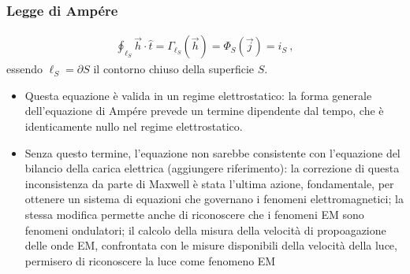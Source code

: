 \documentclass[letterpaper,10pt,italian]{jupyterBook}
\begin{document}
\subsubsection{Legge di Ampére}
\label{\detokenize{ch/electromagnetism/electromagnetism-steady:id1}}\begin{equation*}
\begin{split}\oint_{\ell_S} \vec{h} \cdot \hat{t} = \Gamma_{\ell_S}(\vec{h}) = \Phi_{S}(\vec{j}) = i_S \ ,\end{split}
\end{equation*}
\sphinxAtStartPar
essendo \(\ell_S = \partial S\) il contorno \sphinxhyphen{} chiuso \sphinxhyphen{} della superficie \(S\).
\begin{itemize}
\item {} 
\sphinxAtStartPar
Questa equazione è valida  in un regime elettrostatico: la forma generale dell’equazione di Ampére prevede un termine dipendente dal tempo, che è identicamente nullo nel regime elettrostatico.

\item {} 
\sphinxAtStartPar
Senza questo termine, l’equazione non sarebbe consistente con l’equazione del bilancio della carica elettrica  (aggiungere riferimento): la correzione di questa inconsistenza da parte di Maxwell è stata l’ultima azione, fondamentale, per ottenere un sistema di equazioni che governano i fenomeni elettromagnetici; la stessa modifica permette anche di riconoscere che i fenomeni EM sono fenomeni ondulatori; il calcolo della misura della velocità di propoagazione delle onde EM, confrontata con le misure disponibili della velocità della luce, permisero di riconoscere la luce come fenomeno EM

\end{itemize}
\end{document}
